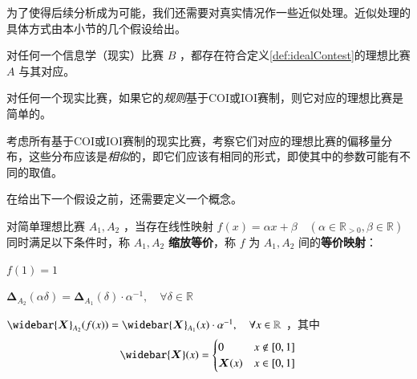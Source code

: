         为了使得后续分析成为可能，我们还需要对真实情况作一些近似处理。近似处理的具体方式由本小节的几个假设给出。

        \begin{assumption}
            对任何一个信息学（现实）比赛 $B$ ，都存在符合定义\ref{def:idealContest}的理想比赛 $A$ 与其对应。

            \label{ass:existenceOfIdealContest}
        \end{assumption}

        \begin{assumption}
            对任何一个现实比赛，如果它的\emph{规则}基于COI或IOI赛制，则它对应的理想比赛是简单的。

            \label{ass:simplicityOfCodingContests}
        \end{assumption}

        \begin{assumption}
            考虑所有基于COI或IOI赛制的现实比赛，考察它们对应的理想比赛的偏移量分布，这些分布应该是\emph{相似}的，即它们应该有相同的形式，即使其中的参数可能有不同的取值。

            \label{ass:similarityOfDeltaDistributions}
        \end{assumption}

        在给出下一个假设之前，还需要定义一个概念。

        \begin{definition}[缩放等价]
            对简单理想比赛 $A_1,A_2$ ，当存在线性映射 $f(x)=\alpha x+\beta\quad(\alpha\in\mathbb{R}_{> 0},\beta\in\mathbb{R})$ 同时满足以下条件时，称 $A_1,A_2$ \textbf{缩放等价}，称 $f$ 为 $A_1,A_2$ 间的\textbf{等价映射}：
            \begin{asparaenum}
                \item $f(1)=1$
                \item $\bm{\Delta}_{A_2}(\alpha\delta)=\bm{\Delta}_{A_1}(\delta)\cdot \alpha^{-1},\quad\forall \delta\in\mathbb{R}$
                \item $\widebar{\bm{X}}_{A_2}(f(x))=\widebar{\bm{X}}_{A_1}(x)\cdot \alpha^{-1},\quad\forall x\in\mathbb{R}$ ，其中
                    $$
                        \widebar{\bm{X}}(x)=
                        \begin{cases} 
                            0 & x\notin [0,1] \\
                            \bm{X}(x) & x\in[0,1]
                        \end{cases}
                    $$
            \end{asparaenum}

            \label{def:equivalenceAfterScaling}
        \end{definition}

